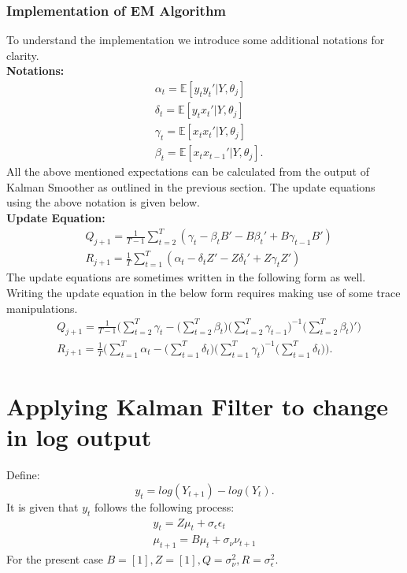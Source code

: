 \documentclass[12pt]{article}
\begin{document}
\subsubsection{Implementation of EM Algorithm}
To understand the implementation we introduce some additional notations for clarity. \\
\textbf{Notations:}
\begin{align*}
& \alpha_t =\mathbb{E}[y_ty_t'|Y, \theta_j] \\
& \delta_t = \mathbb{E}[y_tx_t'|Y, \theta_j] \\
& \gamma_t = \mathbb{E}[x_tx_t'|Y, \theta_j] \\
& \beta_t = \mathbb{E}[x_tx_{t-1}'|Y, \theta_j].
\end{align*}
All the above mentioned expectations can be calculated from the output of Kalman Smoother as outlined in the previous section. The update equations using the above notation is given below.\\
\textbf{Update Equation:}
\begin{align*}
& Q_{j+1} = \frac{1}{T-1} \sum_{t=2}^{T}(\gamma_t - \beta_tB' - B\beta_t' + B\gamma_{t-1}B')\\
& R_{j+1} = \frac{1}{T} \sum_{t=1}^{T}(\alpha_t - \delta_tZ' - Z\delta_t' + Z \gamma_tZ') 
\end{align*}
The update equations are sometimes written in the following form as well. Writing the update equation in the below form requires making use of some trace manipulations.
\begin{align*}
& Q_{j+1} = \frac{1}{T-1} \Bigg( \sum_{t=2}^{T} \gamma_t - \Big(\sum_{t=2}^{T}\beta_t \Big) \Big(\sum_{t=2}^{T} \gamma_{t-1}\Big)^{-1}\Big(\sum_{t=2}^{T}\beta_t\Big)' \Bigg)\\
& R_{j+1} =\frac{1}{T}\Bigg( \sum_{t=1}^{T} \alpha_t - \Big( \sum_{t=1}^{T} \delta_t \Big)\Big(\sum_{t=1}^{T} \gamma_t \Big)^{-1}\Big(\sum_{t=1}^{T} \delta_t\Big) \Bigg).
\end{align*}


\section{Applying Kalman Filter to change in log output}
Define: $$y_t =log(Y_{t+1}) - log(Y_t).$$ It is given that $y_t$ follows the following process:
\begin{align}
y_t = Z \mu_t + \sigma_{\epsilon}\epsilon_t\\
\mu_{t+1} = B \mu_t + \sigma_{\nu}\nu_{t+1}
\end{align}
For the present case $B=[1], Z = [1], Q = \sigma_{\nu}^2, R = \sigma_{\epsilon}^2$.
\end{document}
